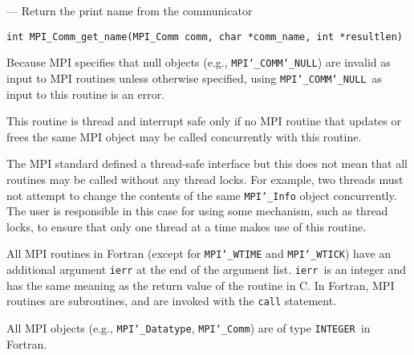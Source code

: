 \startmanpage
{}
--- Return the print name from the communicator 
\startvb\begin{verbatim}
int MPI_Comm_get_name(MPI_Comm comm, char *comm_name, int *resultlen)

\end{verbatim}
\endvb

\par
{}
\par
{}
\par
Because MPI specifies that null objects (e.g., {\tt MPI{\tt \char`\_}COMM{\tt \char`\_}NULL}) are invalid
as input to MPI routines unless otherwise specified, using {\tt MPI{\tt \char`\_}COMM{\tt \char`\_}NULL
}as input to this routine is an error.
\par
\par
{}
\par
This routine is thread and interrupt safe only if no MPI routine that
updates or frees the same MPI object may be called concurrently
with this routine.
\par
The MPI standard defined a thread-safe interface but this does not
mean that all routines may be called without any thread locks.  For
example, two threads must not attempt to change the contents of the
same {\tt MPI{\tt \char`\_}Info} object concurrently.  The user is responsible in this
case for using some mechanism, such as thread locks, to ensure that
only one thread at a time makes use of this routine.
\par
\par
{}
All MPI routines in Fortran (except for {\tt MPI{\tt \char`\_}WTIME} and {\tt MPI{\tt \char`\_}WTICK}) have
an additional argument {\tt ierr} at the end of the argument list.  {\tt ierr
}is an integer and has the same meaning as the return value of the routine
in C.  In Fortran, MPI routines are subroutines, and are invoked with the
{\tt call} statement.
\par
All MPI objects (e.g., {\tt MPI{\tt \char`\_}Datatype}, {\tt MPI{\tt \char`\_}Comm}) are of type {\tt INTEGER
}in Fortran.
